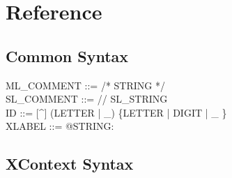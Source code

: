 \section{Reference}
\label{sec:reference}

\subsection{Common Syntax}
\label{sec:common-syntax}
\begin{center}
  \begin{Bcode}
ML_COMMENT ::= /* STRING */\\
SL_COMMENT ::= // SL_STRING \\
ID ::= [^] (LETTER | \_) \{LETTER | DIGIT | \_ \}\\
XLABEL ::= @STRING:\\
  \end{Bcode}
\end{center}


\subsection{XContext Syntax}
\label{sec:xcontext-syntax}

